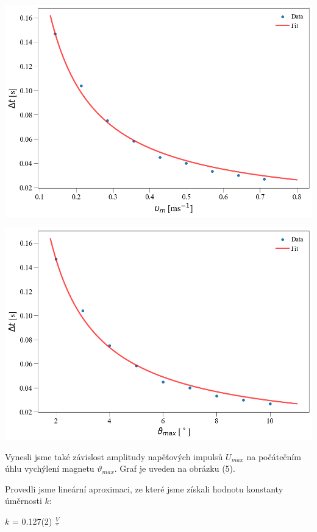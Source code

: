 \documentclass[a4paper,11pt]{article}
\begin{document}
    \begin{minipage}[t]{0.5\textwidth}
                \vspace{0pt}   
                \par \centering
                \includegraphics[scale=0.35]{t_v}
                \captionsetup{justification=centering, font=footnotesize}
                \label{fig:t_v}
                \vspace{10pt}
                \raggedright
                \vspace{10pt}   
                \par \centering
                \includegraphics[scale=0.35]{t_u}
                \captionsetup{justification=centering, font=footnotesize}
                \label{fig:t_u}
                \vspace{10pt}
                \raggedright
                Vynesli jsme také závislost amplitudy napěťových impulsů $U_{max}$ na počátečním úhlu vychýlení magnetu $\vartheta_{max}$. Graf je uveden na obrázku (5).
                \par Provedli jsme lineární aproximaci, ze které jsme získali hodnotu konstanty úměrnosti $k$:
                \begin{center}
                    $k$ = 0.127(2) $\frac{V}{^\circ}$
                \end{center}
    \end{minipage}
\end{document}
